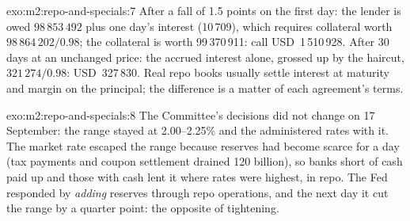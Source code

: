 \begin{solution}{exo:m2:repo-and-specials:7}
After a fall of 1.5 points on the first day: the lender is owed $98\,853\,492$
plus one day's interest (10\,709), which requires collateral worth
$98\,864\,202/0.98$; the collateral is worth 99\,370\,911: call
USD~1\,510\,928. After 30 days at an unchanged price: the accrued interest
alone, grossed up by the haircut, $321\,274/0.98$: USD~327\,830. Real repo
books usually settle interest at maturity and margin on the principal; the
difference is a matter of each agreement's terms.
\end{solution}

\begin{solution}{exo:m2:repo-and-specials:8}
The Committee's decisions did not change on 17 September: the range stayed at
2.00--2.25\% and the administered rates with it. The market rate escaped the
range because reserves had become scarce for a day (tax payments and coupon
settlement drained 120 billion), so banks short of cash paid up and those with
cash lent it where rates were highest, in repo. The Fed responded by
\emph{adding} reserves through repo operations, and the next day it cut the
range by a quarter point: the opposite of tightening.
\end{solution}

